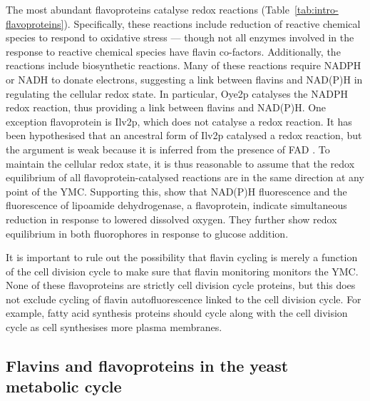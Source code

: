 The most abundant flavoproteins catalyse redox reactions (Table~\ref{tab:intro-flavoproteins}).
Specifically, these reactions include reduction of reactive chemical species to respond to oxidative stress --- though not all enzymes involved in the response to reactive chemical species have flavin co-factors.
Additionally, the reactions include biosynthetic reactions.
Many of these reactions require NADPH or NADH to donate electrons, suggesting a link between flavins and NAD(P)H in regulating the cellular redox state.
In particular, Oye2p catalyses the NADPH redox reaction, thus providing a link between flavins and NAD(P)H\@.
One exception flavoprotein is Ilv2p, which does not catalyse a redox reaction.
It has been hypothesised that an ancestral form of Ilv2p catalysed a redox reaction, but the argument is weak because it is inferred from the presence of FAD \parencite{pangCrystalStructureYeast2002}.
To maintain the cellular redox state, it is thus reasonable to assume that the redox equilibrium of all flavoprotein-catalysed reactions are in the same direction at any point of the YMC\@.
Supporting this, \textcite{sianoNADHFlavinFluorescence1989} show that NAD(P)H fluorescence and the fluorescence of lipoamide dehydrogenase, a flavoprotein, indicate simultaneous reduction in response to lowered dissolved oxygen.
They further show redox equilibrium in both fluorophores in response to glucose addition.

It is important to rule out the possibility that flavin cycling is merely a function of the cell division cycle to make sure that flavin monitoring monitors the YMC\@.
None of these flavoproteins are strictly cell division cycle proteins, but this does not exclude cycling of flavin autofluorescence linked to the cell division cycle.
For example, fatty acid synthesis proteins should cycle along with the cell division cycle as cell synthesises more plasma membranes.

\subsection{Flavins and flavoproteins in the yeast metabolic cycle}
\label{subsec:intro-flavin-ymc}

